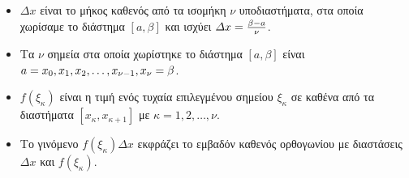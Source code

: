 \documentclass[twoside,10pt]{book}
\DeclareRobustCommand{\frac}[3][0pt]{%
{\begingroup\hspace{#1}#2\hspace{#1}\endgroup\over\hspace{#1}#3\hspace{#1}}}
\begin{document}
\begin{itemize}[itemsep=0mm]
\item $ \varDelta x $ είναι το μήκος καθενός από τα ισομήκη $ \nu $ υποδιαστήματα, στα οποία χωρίσαμε το διάστημα $ [a,\beta] $ και ισχύει $ \varDelta x=\frac{\beta-a}{\nu} $.
\item Τα $ \nu $ σημεία στα οποία χωρίστηκε το διάστημα $ [a,\beta] $ είναι $ a=x_0, x_1,x_2,\ldots,\\x_{\nu-1}, x_\nu=\beta $.
\item $ f(\xi_\kappa) $ είναι η τιμή ενός τυχαία επιλεγμένου σημείου $ \xi_\kappa $ σε καθένα από τα διαστήματα $ \left[x_\kappa,x_{\kappa+1} \right] $ με $ \kappa=1,2,\ldots,\nu $.
\item Το γινόμενο $ f(\xi_\kappa)\varDelta x $ εκφράζει το εμβαδόν καθενός ορθογωνίου με διαστάσεις $ \varDelta x $ και $ f(\xi_\kappa) $.
\begin{center}
\end{center}
\end{itemize}
\end{document}
